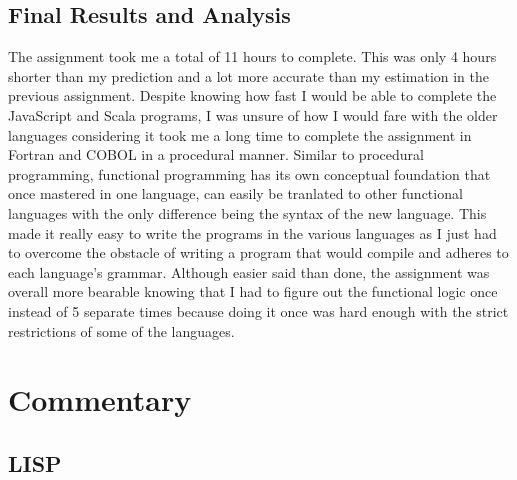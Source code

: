 \documentclass[letterpaper, 10pt, DIV=13]{scrartcl}
\numberwithin{equation}{section}
\numberwithin{figure}{section}
\numberwithin{table}{section}
\begin{document}
\subsection{Final Results and Analysis}
The assignment took me a total of 11 hours to complete. This was only 4 hours shorter than my prediction and a lot more accurate than my estimation in the
previous assignment. Despite knowing how fast I would be able to complete the JavaScript and Scala programs, I was unsure of how I would fare with the older
languages considering it took me a long time to complete the assignment in Fortran and COBOL in a procedural manner. Similar to procedural programming,
functional programming has its own conceptual foundation that once mastered in one language, can easily be tranlated to other functional languages with the
only difference being the syntax of the new language. This made it really easy to write the programs in the various languages as I just had to overcome the
obstacle of writing a program that would compile and adheres to each language's grammar. Although easier said than done, the assignment was overall more bearable
knowing that I had to figure out the functional logic once instead of 5 separate times because doing it once was hard enough with the strict restrictions of some
of the languages.

\section{Commentary}
\subsection{LISP}
\end{document}
